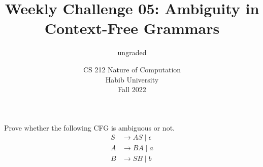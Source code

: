 \documentclass[a4paper]{exam}
\title{Weekly Challenge 05: Ambiguity in Context-Free Grammars}
\author{ungraded} %
\date{CS 212 Nature of Computation\\Habib University\\Fall 2022}
\begin{document}
\maketitle

\begin{questions}
  

  Prove whether the following CFG is ambiguous or not.
  \begin{align*}
    S & \to AS \mid \epsilon\\
    A & \to BA \mid a\\
    B & \to SB \mid b\\
  \end{align*}
  
  \begin{solution}
  
  \end{solution}
\end{questions}
\end{document}

